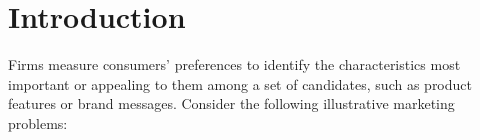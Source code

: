 \documentclass[blindrev,mnsc]{informs3}
\begin{document}
%




\section{Introduction}

Firms measure consumers' preferences to identify the characteristics most important or appealing to them among a set of candidates, such as product features or brand messages. Consider the following illustrative marketing problems:
\end{document}
